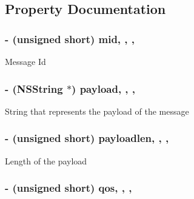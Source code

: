 \subsection{Property Documentation}
\hypertarget{interface_m_q_t_t_message_ae832d3bd3348f97c4a5bf86fd8e0c726}{
\subsubsection[{mid}]{\setlength{\rightskip}{0pt plus 5cm}-\/ (unsigned short) mid\hspace{0.3cm}{\ttfamily [read]}, {\ttfamily [write]}, {\ttfamily [atomic]}, {\ttfamily [assign]}}}\label{interface_m_q_t_t_message_ae832d3bd3348f97c4a5bf86fd8e0c726}
Message Id \hypertarget{interface_m_q_t_t_message_ac2974959b4fca4589e4b6fc9f044f41e}{
\subsubsection[{payload}]{\setlength{\rightskip}{0pt plus 5cm}-\/ (N\-S\-String $\ast$) payload\hspace{0.3cm}{\ttfamily [read]}, {\ttfamily [write]}, {\ttfamily [atomic]}, {\ttfamily [retain]}}}\label{interface_m_q_t_t_message_ac2974959b4fca4589e4b6fc9f044f41e}
String that represents the payload of the message \hypertarget{interface_m_q_t_t_message_af430192b287cfb6ef131f7e3d89249ef}{
\subsubsection[{payloadlen}]{\setlength{\rightskip}{0pt plus 5cm}-\/ (unsigned short) payloadlen\hspace{0.3cm}{\ttfamily [read]}, {\ttfamily [write]}, {\ttfamily [atomic]}, {\ttfamily [assign]}}}\label{interface_m_q_t_t_message_af430192b287cfb6ef131f7e3d89249ef}
Length of the payload \hypertarget{interface_m_q_t_t_message_ae851052977c7286537111ec4072a1ab2}{
\subsubsection[{qos}]{\setlength{\rightskip}{0pt plus 5cm}-\/ (unsigned short) qos\hspace{0.3cm}{\ttfamily [read]}, {\ttfamily [write]}, {\ttfamily [atomic]}, {\ttfamily [assign]}}}\label{interface_m_q_t_t_message_ae851052977c7286537111ec4072a1ab2}
